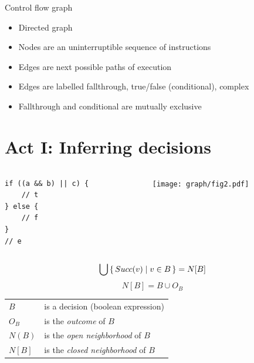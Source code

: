 \documentclass[xcolor = {dvipsnames, table}]{beamer}
\begin{document}
\begin{frame}
    \begin{block}{Control flow graph}
        \begin{itemize}
            \item Directed graph
            \item Nodes are an uninterruptible sequence of instructions
            \item Edges are next possible paths of execution
            \item Edges are labelled fallthrough, true/false (conditional), complex
            \item Fallthrough and conditional are mutually exclusive
        \end{itemize}
    \end{block}
\end{frame}

\section{Act I: Inferring decisions}
\begin{frame}[fragile]
    \begin{columns}
        \begin{column}{0.4\textwidth}
            \begin{lstlisting}[basicstyle = \footnotesize\ttfamily]
if ((a && b) || c) {
    // t
} else {
    // f
}
// e
            \end{lstlisting}
        \end{column}
        \begin{column}{0.4\textwidth}
            \texttt{[image: graph/fig2.pdf]}
        \end{column}
    \end{columns}
\end{frame}

\begin{frame}
    \begin{equation*}
        \bigcup \set{Succ(v) \mid v \in B} = N[B]
    \end{equation*}
    \begin{equation*}
        N[B] = B \cup O_B
    \end{equation*}

    \begin{tabular}{l l}
        $B$    & is a decision (boolean expression) \\
        $O_B$  & is the \emph{outcome} of $B$ \\
        $N(B)$ & is the \emph{open neighborhood} of $B$ \\
        $N[B]$ & is the \emph{closed neighborhood} of $B$ \\
    \end{tabular}
\end{frame}
\end{document}
